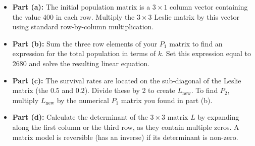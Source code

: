 \begin{hint}
\begin{itemize}
    \item \textbf{Part (a):} The initial population matrix is a $3 \times 1$ column vector containing the value 400 in each row. Multiply the $3 \times 3$ Leslie matrix by this vector using standard row-by-column multiplication.
    \item \textbf{Part (b):} Sum the three row elements of your $P_1$ matrix to find an expression for the total population in terms of $k$. Set this expression equal to 2680 and solve the resulting linear equation.
    \item \textbf{Part (c):} The survival rates are located on the sub-diagonal of the Leslie matrix (the $0.5$ and $0.2$). Divide these by 2 to create $L_{\text{new}}$. To find $P_2$, multiply $L_{\text{new}}$ by the numerical $P_1$ matrix you found in part (b).
    \item \textbf{Part (d):} Calculate the determinant of the $3 \times 3$ matrix $L$ by expanding along the first column or the third row, as they contain multiple zeros. A matrix model is reversible (has an inverse) if its determinant is non-zero.
\end{itemize}
\end{hint}

